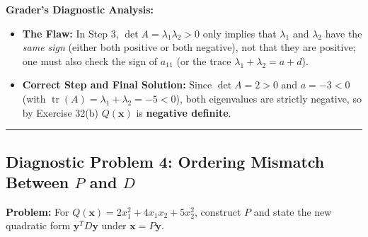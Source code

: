 \documentclass[11pt, letterpaper]{article}
\theoremstyle{definition}
\theoremstyle{remark}
\begin{document}
\textbf{Grader's Diagnostic Analysis:}
\begin{itemize}
    \item \textbf{The Flaw:} In Step 3, $\det A = \lambda_1 \lambda_2 > 0$ only implies that $\lambda_1$ and $\lambda_2$ have the \textit{same sign} (either both positive or both negative), not that they are positive; one must also check the sign of $a_{11}$ (or the trace $\lambda_1 + \lambda_2 = a + d$).
    \item \textbf{Correct Step and Final Solution:} Since $\det A = 2 > 0$ and $a = -3 < 0$ (with $\operatorname{tr}(A) = \lambda_1 + \lambda_2 = -5 < 0$), both eigenvalues are strictly negative, so by Exercise 32(b) $Q(\mathbf{x})$ is \textbf{negative definite}.
\end{itemize}

\medskip\hrule\medskip

\subsection*{Diagnostic Problem 4: Ordering Mismatch Between $P$ and $D$}
\textbf{Problem:} For $Q(\mathbf{x}) = 2x_1^2 + 4x_1x_2 + 5x_2^2$, construct $P$ and state the new quadratic form $\mathbf{y}^T D \mathbf{y}$ under $\mathbf{x} = P\mathbf{y}$.
\end{document}

